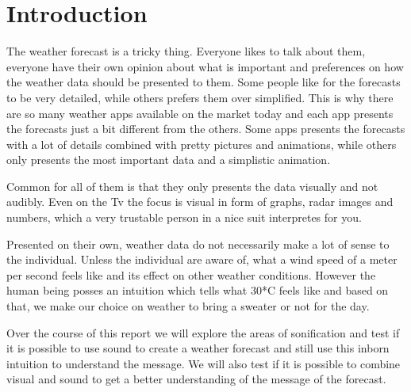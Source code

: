 
\section{Introduction} %
\label{sec:introduction}

The weather forecast is a tricky thing. 
Everyone likes to talk about them, everyone have their own opinion about what is important and preferences on how the weather data should be presented to them. 
Some people like for the forecasts to be very detailed, while others prefers them over simplified. 
This is why there are so many weather apps available on the market today and each app presents the forecasts just a bit different from the others. 
Some apps presents the forecasts with a lot of details combined with pretty pictures and animations, while others only presents the most important data and a simplistic animation.

Common for all of them is that they only presents the data visually and not audibly. 
Even on the Tv the focus is visual in form of graphs, radar images and numbers, which a very trustable person in a nice suit interpretes for you.

Presented on their own, weather data do not necessarily make a lot of sense to the individual. 
Unless the individual are aware of, what a wind speed of a meter per second feels like and its effect on other weather conditions. 
However the human being posses an intuition which tells what 30*C feels like and based on that, we make our choice on weather to bring a sweater or not for the day.

Over the course of this report we will explore the areas of sonification and test if it is possible to use sound to create a weather forecast and still use this inborn intuition to understand the message.
We will also test if it is possible to combine visual and sound to get a better understanding of the message of the forecast.



